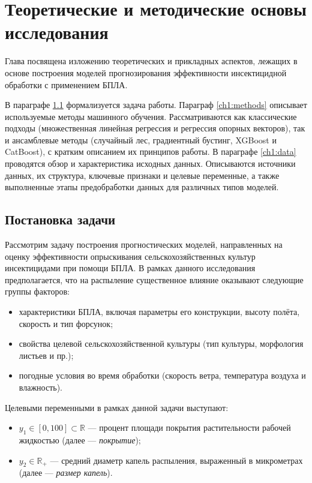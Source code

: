 \chapter{Теоретические и методические основы исследования} \label{ch1}

Глава посвящена изложению теоретических и прикладных аспектов, лежащих в основе построения моделей прогнозирования эффективности инсектицидной обработки с применением БПЛА.

В параграфе \ref{ch1:task} формализуется задача работы. Параграф \ref{ch1:methods} описывает используемые методы машинного обучения. Рассматриваются как классические подходы (множественная линейная регрессия и регрессия опорных векторов), так и ансамблевые методы (случайный лес, градиентный бустинг, XGBoost и CatBoost), с кратким описанием их принципов работы. В параграфе \ref{ch1:data} проводятся обзор и характеристика исходных данных. Описываются источники данных, их структура, ключевые признаки и целевые переменные, а также выполненные этапы предобработки данных для различных типов моделей.

\section{Постановка задачи} \label{ch1:task}
Рассмотрим задачу построения прогностических моделей, направленных на оценку эффективности опрыскивания сельскохозяйственных культур инсектицидами при помощи БПЛА. В рамках данного исследования предполагается, что на распыление существенное влияние оказывают следующие группы факторов: 
\begin{itemize}
\item характеристики БПЛА, включая параметры его конструкции, высоту полёта, скорость и тип форсунок; 
\item свойства целевой сельскохозяйственной культуры (тип культуры, морфология листьев и пр.); 
\item погодные условия во время обработки (скорость ветра, температура воздуха и влажность).
\end{itemize}

Целевыми переменными в рамках данной задачи выступают:
\begin{itemize}
\item $y_1 \in [0, 100] \subset \mathbb{R}$ --- процент площади покрытия растительности рабочей жидкостью (далее --- \textit{покрытие});
\item $y_2 \in \mathbb{R}_{+}$ --- средний диаметр капель распыления, выраженный в микрометрах (далее --- \textit{размер капель}).
\end{itemize}

